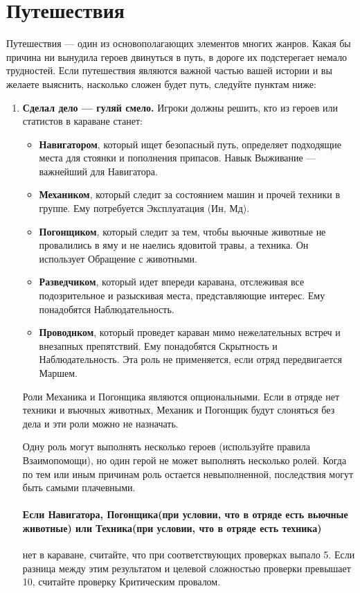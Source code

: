 \section{Путешествия}
Путешествия — один из основополагающих элементов многих жанров. Какая бы причина ни вынудила героев двинуться в путь, в дороге их подстерегает немало трудностей. Если путешествия являются важной частью вашей истории и вы желаете выяснить, насколько сложен будет путь, следуйте пунктам ниже:
\begin{enumerate}
\item \textbf{Сделал дело — гуляй смело.} Игроки должны решить, кто из героев или статистов в караване станет:
\begin{itemize}
\item \textbf{Навигатором}, который ищет безопасный путь, определяет подходящие места для стоянки и пополнения припасов. Навык Выживание — важнейший для Навигатора.
\item \textbf{Механиком}, который следит за состоянием машин и прочей техники в группе. Ему потребуется Эксплуатация (Ин, Мд).
\item \textbf{Погонщиком}, который следит за тем, чтобы вьючные животные не провалились в яму и не наелись ядовитой травы, а техника. Он использует Обращение с животными.
\item \textbf{Разведчиком}, который идет впереди каравана, отслеживая все подозрительное и разыскивая места, представляющие интерес. Ему понадобятся Наблюдательность.
\item \textbf{Проводнком}, который проведет караван мимо нежелательных встреч и внезапных препятствий. Ему понадобятся Скрытность и Наблюдательность. Эта роль не применяется, если отряд передвигается Маршем. 
\end{itemize}
\begin{tcolorbox}
Роли Механика и Погонщика являются опциональными. Если в отряде нет техники и въючных животных, Механик и Погонщик будут слоняться без дела и эти роли можно не назначать.
\end{tcolorbox}
Одну роль могут выполнять несколько героев (используйте правила Взаимопомощи), но один герой не может выполнять несколько ролей.
\newline
Когда по тем или иным причинам роль остается невыполненной, последствия могут быть самыми плачевными.
\paragraph{Если Навигатора, Погонщика(при условии, что в отряде есть вьючные животные) или Техника(при условии, что в отряде есть техника)} нет в караване, считайте, что при соответствующих проверках выпало 5. Если разница между этим результатом и целевой сложностью проверки превышает 10, считайте проверку Критическим провалом.

\end{enumerate}
